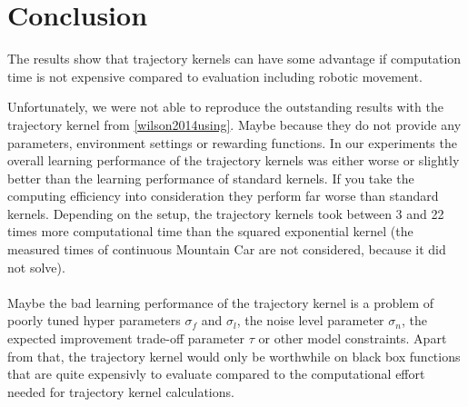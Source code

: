 \section{Conclusion}

The results show that trajectory kernels can have some advantage if computation time is not expensive compared to evaluation including robotic movement.

Unfortunately, we were not able to reproduce the outstanding results with the trajectory kernel from \ref{wilson2014using}. Maybe because they do not provide any parameters, environment settings or rewarding functions. In our experiments the overall learning performance of the trajectory kernels was either worse or slightly better than the learning performance of standard kernels. If you take the computing efficiency into consideration they perform far worse than standard kernels. Depending on the setup, the trajectory kernels took between 3 and 22 times more computational time than the squared exponential kernel (the measured times of continuous Mountain Car are not considered, because it did not solve).\\
\\
Maybe the bad learning performance of the trajectory kernel is a problem of poorly tuned hyper parameters $\sigma_f$ and $\sigma_l$, the noise level parameter $\sigma_n$, the expected improvement trade-off parameter $\tau$ or other model constraints. Apart from that, the trajectory kernel would only be worthwhile on black box functions that are quite expensivly to evaluate compared to the computational effort needed for trajectory kernel calculations.
